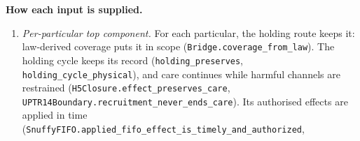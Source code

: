 \documentclass[
]{article}
\providecommand{\tightlist}{%
  \setlength{\itemsep}{0pt}\setlength{\parskip}{0pt}}
\begin{document}
\textbf{How each input is supplied.}

\begin{enumerate}
\def\labelenumi{\arabic{enumi}.}
\tightlist
\item
  \emph{Per-particular top component.} For each particular, the holding
  route keeps it: law-derived coverage puts it in scope
  (\texttt{B\allowbreak{}r\allowbreak{}i\allowbreak{}d\allowbreak{}g\allowbreak{}e\allowbreak{}.\allowbreak{}c\allowbreak{}o\allowbreak{}v\allowbreak{}e\allowbreak{}r\allowbreak{}a\allowbreak{}g\allowbreak{}e\allowbreak{}\_\allowbreak{}f\allowbreak{}r\allowbreak{}o\allowbreak{}m\allowbreak{}\_\allowbreak{}l\allowbreak{}a\allowbreak{}w}).
  The holding cycle keeps its record
  (\texttt{h\allowbreak{}o\allowbreak{}l\allowbreak{}d\allowbreak{}i\allowbreak{}n\allowbreak{}g\allowbreak{}\_\allowbreak{}p\allowbreak{}r\allowbreak{}e\allowbreak{}s\allowbreak{}e\allowbreak{}r\allowbreak{}v\allowbreak{}e\allowbreak{}s},
  \texttt{h\allowbreak{}o\allowbreak{}l\allowbreak{}d\allowbreak{}i\allowbreak{}n\allowbreak{}g\allowbreak{}\_\allowbreak{}c\allowbreak{}y\allowbreak{}c\allowbreak{}l\allowbreak{}e\allowbreak{}\_\allowbreak{}p\allowbreak{}h\allowbreak{}y\allowbreak{}s\allowbreak{}i\allowbreak{}c\allowbreak{}a\allowbreak{}l}),
  and care continues while harmful channels are restrained
  (\texttt{H\allowbreak{}5\allowbreak{}C\allowbreak{}l\allowbreak{}o\allowbreak{}s\allowbreak{}u\allowbreak{}r\allowbreak{}e\allowbreak{}.\allowbreak{}e\allowbreak{}f\allowbreak{}f\allowbreak{}e\allowbreak{}c\allowbreak{}t\allowbreak{}\_\allowbreak{}p\allowbreak{}r\allowbreak{}e\allowbreak{}s\allowbreak{}e\allowbreak{}r\allowbreak{}v\allowbreak{}e\allowbreak{}s\allowbreak{}\_\allowbreak{}c\allowbreak{}a\allowbreak{}r\allowbreak{}e},
  \texttt{U\allowbreak{}P\allowbreak{}T\allowbreak{}R\allowbreak{}1\allowbreak{}4\allowbreak{}B\allowbreak{}o\allowbreak{}u\allowbreak{}n\allowbreak{}d\allowbreak{}a\allowbreak{}r\allowbreak{}y\allowbreak{}.\allowbreak{}r\allowbreak{}e\allowbreak{}c\allowbreak{}r\allowbreak{}u\allowbreak{}i\allowbreak{}t\allowbreak{}m\allowbreak{}e\allowbreak{}n\allowbreak{}t\allowbreak{}\_\allowbreak{}n\allowbreak{}e\allowbreak{}v\allowbreak{}e\allowbreak{}r\allowbreak{}\_\allowbreak{}e\allowbreak{}n\allowbreak{}d\allowbreak{}s\allowbreak{}\_\allowbreak{}c\allowbreak{}a\allowbreak{}r\allowbreak{}e}).
  Its authorised effects are applied in time
  (\texttt{S\allowbreak{}n\allowbreak{}u\allowbreak{}f\allowbreak{}f\allowbreak{}y\allowbreak{}F\allowbreak{}I\allowbreak{}F\allowbreak{}O\allowbreak{}.\allowbreak{}a\allowbreak{}p\allowbreak{}p\allowbreak{}l\allowbreak{}i\allowbreak{}e\allowbreak{}d\allowbreak{}\_\allowbreak{}f\allowbreak{}i\allowbreak{}f\allowbreak{}o\allowbreak{}\_\allowbreak{}e\allowbreak{}f\allowbreak{}f\allowbreak{}e\allowbreak{}c\allowbreak{}t\allowbreak{}\_\allowbreak{}i\allowbreak{}s\allowbreak{}\_\allowbreak{}t\allowbreak{}i\allowbreak{}m\allowbreak{}e\allowbreak{}l\allowbreak{}y\allowbreak{}\_\allowbreak{}a\allowbreak{}n\allowbreak{}d\allowbreak{}\_\allowbreak{}a\allowbreak{}u\allowbreak{}t\allowbreak{}h\allowbreak{}o\allowbreak{}r\allowbreak{}i\allowbreak{}z\allowbreak{}e\allowbreak{}d},

\end{enumerate}
\end{document}
